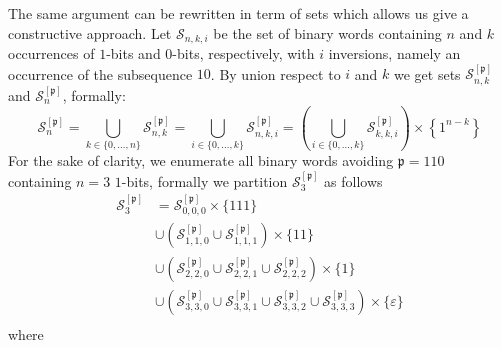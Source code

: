 The same argument can be rewritten in term of sets which allows us give a constructive approach.
Let $\mathcal{S}_{n, k, i}$ be the set of binary words containing
$n$ and $k$ occurrences of $1$-bits  and $0$-bits, respectively, with $i$ inversions,
namely an occurrence of the subsequence $10$.
By union respect to $i$ and $k$ we get sets $\mathcal{S}_{n,
k}^{[\mathfrak{p}]}$ and $\mathcal{S}_{n}^{[\mathfrak{p}]}$, formally:
\begin{displaymath}
    \mathcal{S}_{n}^{[\mathfrak{p}]} =
        \bigcup_{k\in \lbrace 0,\ldots,n \rbrace} {\mathcal{S}_{n, k}^{[\mathfrak{p}]}} =
        \bigcup_{i\in \lbrace 0,\ldots,k \rbrace} {\mathcal{S}_{n, k, i}^{[\mathfrak{p}]}} =
         {\left(\bigcup_{i\in \lbrace 0,\ldots,k \rbrace}{
                    \mathcal{S}_{k, k, i}^{[\mathfrak{p}]}}\right)\times \left\lbrace 1^{n-k} \right\rbrace}
\end{displaymath}
For the sake of clarity, we enumerate all binary words avoiding $\mathfrak{p}=110$
containing $n=3$ $1$-bits, formally we partition $\mathcal{S}_{3}^{[\mathfrak{p}]}$ as follows
\begin{displaymath}
    \begin{split}
        \mathcal{S}_{3}^{[\mathfrak{p}]} &= \mathcal{S}_{0, 0, 0}^{[\mathfrak{p}]}\times\lbrace 111 \rbrace\\
            &\cup{\left(\mathcal{S}_{1, 1, 0}^{[\mathfrak{p}]}\cup\mathcal{S}_{1, 1, 1}^{[\mathfrak{p}]}\right)\times \lbrace 11 \rbrace}\\
            &\cup{\left(\mathcal{S}_{2, 2, 0}^{[\mathfrak{p}]}\cup\mathcal{S}_{2, 2, 1}^{[\mathfrak{p}]}\cup\mathcal{S}_{2, 2, 2}^{[\mathfrak{p}]}\right)\times \lbrace 1 \rbrace}\\
            &\cup{\left(\mathcal{S}_{3, 3, 0}^{[\mathfrak{p}]}\cup\mathcal{S}_{3, 3, 1}^{[\mathfrak{p}]}\cup\mathcal{S}_{3, 3, 2}^{[\mathfrak{p}]}\cup\mathcal{S}_{3, 3, 3}^{[\mathfrak{p}]}\right)\times \lbrace \varepsilon \rbrace}\\
    \end{split}
\end{displaymath}
where
